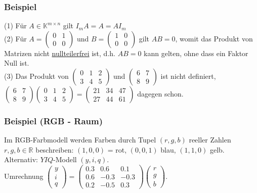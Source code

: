 \subsubsection{Beispiel}
(1) Für $A\in \mathbb{K}^{m\times n}$ gilt $I_m A=A=AI_m$\\
(2) Für $A=\left(\begin{array}{cc}0 & 1\\ 0 & 0\end{array}\right)$ und $B=\left(\begin{array}{cc}1 & 0\\ 0 & 0\end{array}\right)$ gilt $AB=0$, womit das Produkt von Matrizen nicht \underline{nullteilerfrei} ist, d.h. $AB=0$ kann gelten, ohne dass ein Faktor Null ist.\\
(3) Das Produkt von $\left(\begin{array}{ccc}0 & 1 & 2 \\ 3 & 4 & 5\end{array}\right)$ und $\left(\begin{array}{cc}6 & 7 \\ 8 & 9\end{array}\right)$ ist nicht definiert,
$\left(\begin{array}{cc}6 & 7 \\ 8 & 9\end{array}\right)\left(\begin{array}{ccc}0 & 1 & 2 \\ 3 & 4 & 5\end{array}\right) = \left(\begin{array}{ccc}21 & 34 & 47 \\ 27 & 44 & 61\end{array}\right)$ dagegen schon.
\subsubsection{Beispiel (RGB - Raum)}
Im RGB-Farbmodell werden Farben durch Tupel $(r,g,b)$ reeller Zahlen $r,g,b\in \mathbb{R}$ beschreiben: $(1,0,0)$ = rot, $(0,0,1)$ blau, $(1,1,0)$ gelb.  Alternativ: $YIQ$-Modell $(y,i,q)$. \\
Umrechnung $\left(\begin{array}{c}y\\i\\q\end{array}\right)=\left(\begin{array}{ccc}0.3 & 0.6 & 0.1\\ 0.6 & -0.3 & -0.3\\ 0.2 & -0.5 & 0.3\end{array}\right) \left(\begin{array}{c}r\\g\\b\end{array}\right)$.
